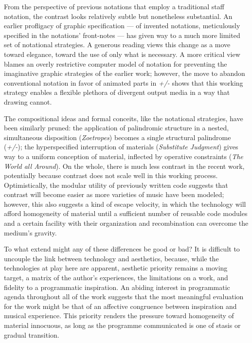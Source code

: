 From the perspective of previous notations that employ a traditional staff notation, the contrast looks relatively subtle but nonetheless substantial. An earlier profligacy of graphic specification --- of invented notations, meticulously specified in the notations' front-notes --- has given way to a much more limited set of notational strategies. A generous reading views this change as a move toward elegance, toward the use of only what is necessary. A more critical view blames an overly restrictive computer model of notation for preventing the imaginative graphic strategies of the earlier work; however, the move to abandon conventional notation in favor of animated parts in \emph{+/-} shows that this working strategy enables a flexible plethora of divergent output media in a way that drawing cannot. 

The compositional ideas and formal conceits, like the notational strategies, have been similarly pruned: the application of palindromic structure in a nested, simultaneous disposition (\emph{Zoetropes}) becomes a single structural palindrome (\emph{+/-}); the hyperspecified interruption of materials (\emph{Substitute Judgment}) gives way to a uniform conception of material, inflected by operative constraints (\emph{The World all Around}). On the whole, there is much less contrast in the recent work, potentially because contrast does not scale well in this working process. Optimistically, the modular utility of previously written code suggests that contrast will become easier as more varieties of music have been modeled; however, this also suggests a kind of escape velocity, in which the technology will afford homogeneity of material until a sufficient number of reusable code modules and a certain facility with their organization and recombination can overcome the medium's gravity.

To what extend might any of these differences be good or bad? It is difficult to uncouple the link between technology and aesthetics, because, while the technologies at play here are apparent, aesthetic priority remains a moving target, a matrix of the author's experiences, the limitations on a work, and fidelity to a programmatic inspiration. An abiding interest in programmatic agenda throughout all of the work suggests that the most meaningful evaluation for the work might be that of an affective congruence between inspiration and musical experience. This priority renders the pressure toward homogeneity of material innocuous, as long as the programme communicated is one of stasis or gradual transition. 

